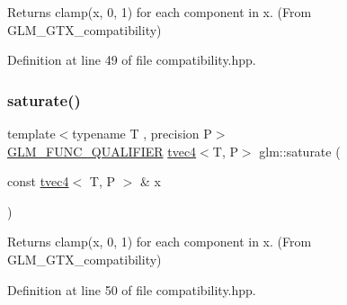Returns clamp(x, 0, 1) for each component in x. (From G\+L\+M\+\_\+\+G\+T\+X\+\_\+compatibility) 



Definition at line 49 of file compatibility.\+hpp.

\mbox{\label{group__gtx__compatibility_ga63791409bdef9745b956406afe3157f1}} 
\subsubsection{\texorpdfstring{saturate()}{saturate()}\hspace{0.1cm}{\footnotesize\ttfamily [4/4]}}
{\footnotesize\ttfamily template$<$typename T , precision P$>$ \\
\mbox{\hyperlink{setup_8hpp_a33fdea6f91c5f834105f7415e2a64407}{G\+L\+M\+\_\+\+F\+U\+N\+C\+\_\+\+Q\+U\+A\+L\+I\+F\+I\+ER}} \mbox{\hyperlink{structglm_1_1tvec4}{tvec4}}$<$T, P$>$ glm\+::saturate (\begin{DoxyParamCaption}\item[{const \mbox{\hyperlink{structglm_1_1tvec4}{tvec4}}$<$ T, P $>$ \&}]{x }\end{DoxyParamCaption})}



Returns clamp(x, 0, 1) for each component in x. (From G\+L\+M\+\_\+\+G\+T\+X\+\_\+compatibility) 



Definition at line 50 of file compatibility.\+hpp.


